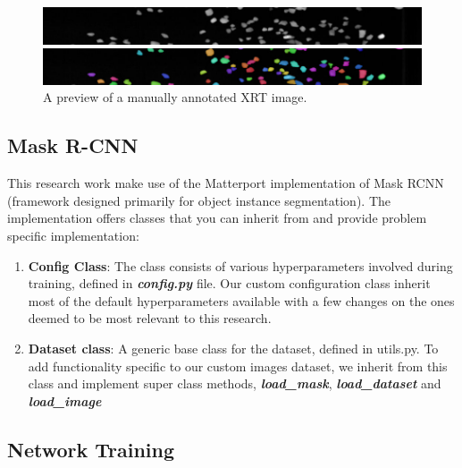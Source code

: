 \documentclass[conference]{IEEEtran}
\begin{document}
		\begin{figure}[htbp]
			\centering
			\includegraphics[width=1\linewidth]{2-raw-image.png}
			
			\vspace{.1cm}
			
			\includegraphics[width=1\linewidth]{2-ground-truth.png}
			\caption{A preview of a manually annotated XRT image.}
			\label{XRT Ground-truth}
		\end{figure}
	

	\subsection{Mask R-CNN}
		
		This research work make use of the Matterport implementation of Mask RCNN (framework
designed primarily for object instance segmentation). The implementation offers classes
that you can inherit from and provide problem specific implementation:
		
		\begin{enumerate}
			\item \textbf{Config Class}: The class consists of various hyperparameters involved during training, defined in \textbf{\textit{config.py}} file. Our custom configuration class inherit most of the default hyperparameters available with a few changes on the ones deemed to be most relevant to this research.
			
			\item \textbf{Dataset class}: A generic base class for the dataset, defined in utils.py. To add functionality specific to our custom images dataset, we inherit from this class and implement
			super class methods, \textbf{\textit{load\_mask}}, \textbf{\textit{load\_dataset}} and \textbf{\textit{load\_image}}
		\end{enumerate}
	
	\subsection{Network Training}
		
\end{document}
